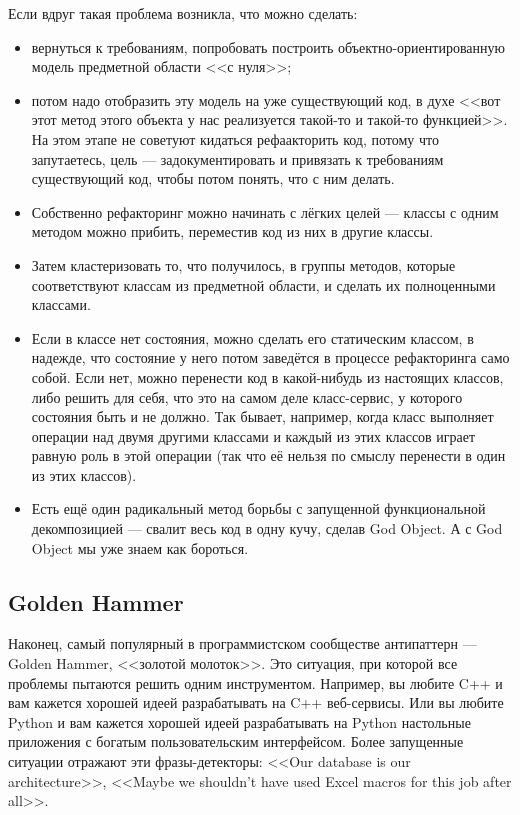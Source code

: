 \documentclass{../../text-style}
\begin{document}
Если вдруг такая проблема возникла, что можно сделать:

\begin{itemize}
    \item вернуться к требованиям, попробовать построить объектно-ориентированную модель предметной области <<с нуля>>;
    \item потом надо отобразить эту модель на уже существующий код, в духе <<вот этот метод этого объекта у нас реализуется такой-то и такой-то функцией>>. На этом этапе не советуют кидаться рефаакторить код, потому что запутаетесь, цель --- задокументировать и привязать к требованиям существующий код, чтобы потом понять, что с ним делать.
    \item Собственно рефакторинг можно начинать с лёгких целей --- классы с одним методом можно прибить, переместив код из них в другие классы.
    \item Затем кластеризовать то, что получилось, в группы методов, которые соответствуют классам из предметной области, и сделать их полноценными классами.
    \item Если в классе нет состояния, можно сделать его статическим классом, в надежде, что состояние у него потом заведётся в процессе рефакторинга само собой. Если нет, можно перенести код в какой-нибудь из настоящих классов, либо решить для себя, что это на самом деле класс-сервис, у которого состояния быть и не должно. Так бывает, например, когда класс выполняет операции над двумя другими классами и каждый из этих классов играет равную роль в этой операции (так что её нельзя по смыслу перенести в один из этих классов).
    \item Есть ещё один радикальный метод борьбы с запущенной функциональной декомпозицией --- свалит весь код в одну кучу, сделав God Object. А с God Object мы уже знаем как бороться.
\end{itemize}

\subsection{Golden Hammer}

Наконец, самый популярный в программистском сообществе антипаттерн --- Golden Hammer, <<золотой молоток>>. Это ситуация, при которой все проблемы пытаются решить одним инструментом. Например, вы любите C++ и вам кажется хорошей идеей разрабатывать на C++ веб-сервисы. Или вы любите Python и вам кажется хорошей идеей разрабатывать на Python настольные приложения с богатым пользовательским интерфейсом. Более запущенные ситуации отражают эти фразы-детекторы: <<Our database is our architecture>>, <<Maybe we shouldn’t have used Excel macros for this job
after all>>.
\end{document}
